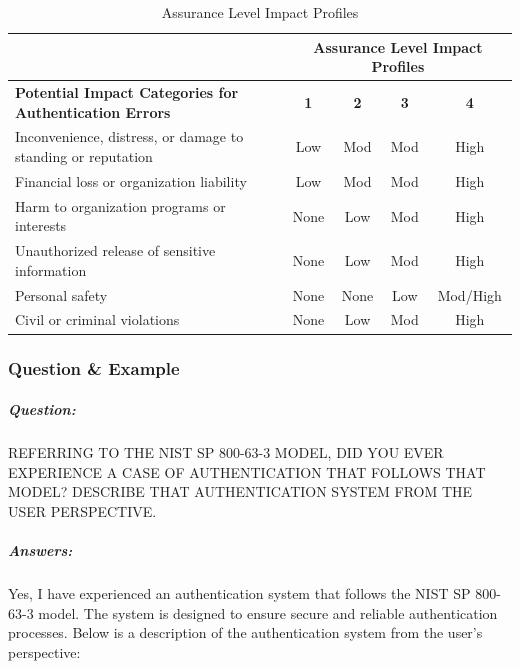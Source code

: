 \documentclass{article}
\begin{document}
                        \begin{table}[h!]
                            \centering
                            \begin{tabular}{|m{7cm}|c|c|c|c|}
                                \hline
                                                                                                & \multicolumn{4}{|c|}{Assurance Level Impact Profiles}\\
                                \hline
                                \textbf{Potential Impact Categories for Authentication Errors} & \textbf{1} & \textbf{2} & \textbf{3} & \textbf{4} \\
                                \hline
                                Inconvenience, distress, or damage to standing or reputation & Low & Mod & Mod & High \\
                                \hline
                                Financial loss or organization liability & Low & Mod & Mod & High \\
                                \hline
                                Harm to organization programs or interests & None & Low & Mod & High \\
                                \hline
                                Unauthorized release of sensitive information & None & Low & Mod & High \\
                                \hline
                                Personal safety & None & None & Low & Mod/High \\
                                \hline
                                Civil or criminal violations & None & Low & Mod & High \\
                                \hline
                            \end{tabular}
                            \caption{Assurance Level Impact Profiles}
                    \end{table}
                    \newpage
                \subsubsection{Question \& Example}
                    \subparagraph{Question:}
                    REFERRING TO THE NIST SP 800-63-3 MODEL, DID YOU EVER
                    EXPERIENCE A CASE OF AUTHENTICATION THAT FOLLOWS THAT
                    MODEL?
                    DESCRIBE THAT AUTHENTICATION SYSTEM FROM THE USER
                    PERSPECTIVE.
                    \subparagraph{Answers:}
                    Yes, I have experienced an authentication system that follows the NIST SP 800-63-3 model. The system is designed to ensure secure and reliable authentication processes. Below is a description of the authentication system from the user's perspective:
\end{document}
